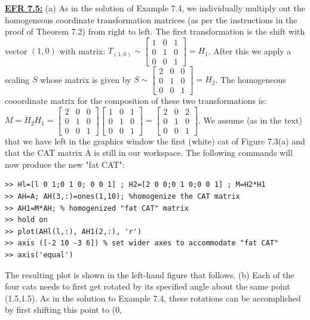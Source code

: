 \documentclass[../main.tex]{subfiles}
\begin{document}
\textbf{\underline{EFR 7.5:}} (a) As in the solution of Example 7.4, we individually multiply out the homogeneous coordinate transformation matrices (as per the instructions in the proof of Theorem 7.2) from right to left. The first transformation is the shift with vector $(1,0)$ with matrix: $T_{(1,0)} \sim\left[\begin{array}{lll}1 & 0 & 1 \\ 0 & 1 & 0 \\ 0 & 0 & 1\end{array}\right]=H_{1}$. After this we apply a scaling $S$ whose matrix is given by $S \sim\left[\begin{array}{lll}2 & 0 & 0 \\ 0 & 1 & 0 \\ 0 & 0 & 1\end{array}\right]=H_{2}$. The homogeneous cooordinate matrix for the composition of these two transformations is: $M=H_{2} H_{1}=\left[\begin{array}{lll}2 & 0 & 0 \\ 0 & 1 & 0 \\ 0 & 0 & 1\end{array}\right]\left[\begin{array}{lll}1 & 0 & 1 \\ 0 & 1 & 0 \\ 0 & 0 & 1\end{array}\right]=\left[\begin{array}{lll}2 & 0 & 2 \\ 0 & 1 & 0 \\ 0 & 0 & 1\end{array}\right]$. We assume (as in the text) that we have left in the graphics window the first (white) cat of Figure 7.3(a) and that the CAT matrix A is still in our 
workspace. The following commands will now produce the new "fat CAT":
\begin{lstlisting}[numbers=none,frame=none]
>> Hl=[l 0 1;0 1 0; 0 0 1] ; H2=[2 0 0;0 1 0;0 0 1] ; M=H2*H1 
>> AH=A; AH(3,:)=ones(1,10); %homogenize the CAT matrix 
>> AH1=M*AH; % homogenized "fat CAT" matrix 
>> hold on 
>> plot(AHl(l,:), AH1(2,:), 'r') 
>> axis ([-2 10 -3 6]) % set wider axes to accommodate "fat CAT" 
>> axis('equal') 
\end{lstlisting}
The resulting plot is shown in the left-hand figure that follows. 
(b) Each of the four cats needs to first get rotated by its specified angle about the same point (1.5,1.5). 
As in the solution to Example 7.4, these rotations can be accomplished by first shifting this point to (0, 
\end{document}
